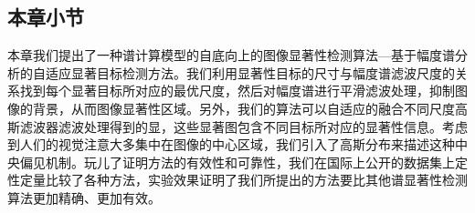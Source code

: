 \subsection{本章小节}
\label{4_2_5}

本章我们提出了一种谱计算模型的自底向上的图像显著性检测算法---基于幅度谱分析的自适应显著目标检测方法。我们利用显著性目标的尺寸与幅度谱滤波尺度的关系找到每个显著目标所对应的最优尺度，然后对幅度谱进行平滑滤波处理，抑制图像的背景，从而图像显著性区域。另外，我们的算法可以自适应的融合不同尺度高斯滤波器滤波处理得到的显，这些显著图包含不同目标所对应的显著性信息。考虑到人们的视觉注意大多集中在图像的中心区域，我们引入了高斯分布来描述这种中央偏见机制。玩儿了证明方法的有效性和可靠性，我们在国际上公开的数据集上定性定量比较了各种方法，实验效果证明了我们所提出的方法要比其他谱显著性检测算法更加精确、更加有效。

















